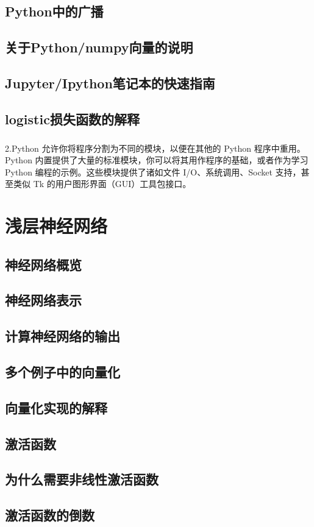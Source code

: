 \documentclass{article}
\begin{document}
\begin{CJK}{UTF8}{gbsn}
\subsection{Python中的广播}
\subsection{关于Python/numpy向量的说明}
\subsection{Jupyter/Ipython笔记本的快速指南}
\subsection{logistic损失函数的解释}
\subparagraph*{}
2.Python 允许你将程序分割为不同的模块，以便在其他的 Python 程序中重用。Python 内置提供了大量的标准模块，你可以将其用作程序的基础，或者作为学习 Python 编程的示例。这些模块提供了诸如文件 I/O、系统调用、Socket 支持，甚至类似 Tk 的用户图形界面（GUI）工具包接口。
\section{浅层神经网络}
\subsection{神经网络概览}
\subsection{神经网络表示}
\subsection{计算神经网络的输出}
\subsection{多个例子中的向量化}
\subsection{向量化实现的解释}
\subsection{激活函数}
\subsection{为什么需要非线性激活函数}
\subsection{激活函数的倒数}

\end{CJK}
\end{document}

